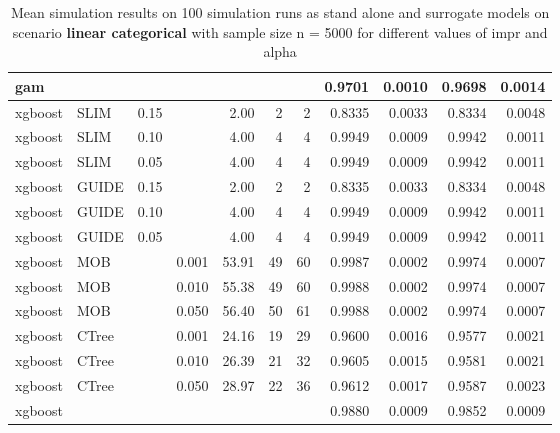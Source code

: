 \begin{table}[!htb]
\begin{tabular}[t]{l|l|r|r|r|r|r|r|r|r|r}
\hline
gam & & & & & & & 0.9701 & 0.0010 & 0.9698 & 0.0014\\
\hline

xgboost & SLIM & 0.15 & & 2.00 & 2 & 2 & 0.8335 & 0.0033 & 0.8334 & 0.0048\\
xgboost & SLIM & 0.10 & & 4.00 & 4 & 4 & 0.9949 & 0.0009 & 0.9942 & 0.0011\\
xgboost & SLIM & 0.05 & & 4.00 & 4 & 4 & 0.9949 & 0.0009 & 0.9942 & 0.0011\\
xgboost & GUIDE & 0.15 & & 2.00 & 2 & 2 & 0.8335 & 0.0033 & 0.8334 & 0.0048\\
xgboost & GUIDE & 0.10 & & 4.00 & 4 & 4 & 0.9949 & 0.0009 & 0.9942 & 0.0011\\
xgboost & GUIDE & 0.05 & & 4.00 & 4 & 4 & 0.9949 & 0.0009 & 0.9942 & 0.0011\\
xgboost & MOB & & 0.001 & 53.91 & 49 & 60 & 0.9987 & 0.0002 & 0.9974 & 0.0007\\
xgboost & MOB & & 0.010 & 55.38 & 49 & 60 & 0.9988 & 0.0002 & 0.9974 & 0.0007\\
xgboost & MOB & & 0.050 & 56.40 & 50 & 61 & 0.9988 & 0.0002 & 0.9974 & 0.0007\\
xgboost & CTree & & 0.001 & 24.16 & 19 & 29 & 0.9600 & 0.0016 & 0.9577 & 0.0021\\
xgboost & CTree &  & 0.010 & 26.39 & 21 & 32 & 0.9605 & 0.0015 & 0.9581 & 0.0021\\
xgboost & CTree & & 0.050 & 28.97 & 22 & 36 & 0.9612 & 0.0017 & 0.9587 & 0.0023\\
\hline
xgboost & & & & & & & 0.9880 & 0.0009 & 0.9852 & 0.0009\\
\hline

\end{tabular}
\caption{Mean simulation results on 100 simulation runs as stand alone and surrogate models on scenario \textbf{linear categorical} with sample size n = 5000 for different values of impr and alpha}
\label{tab:app_linear_abrupt_5000}

\end{table}




